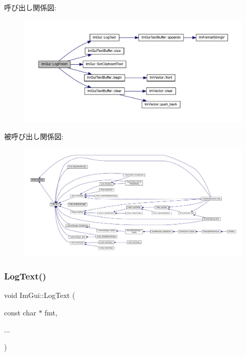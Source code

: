 呼び出し関係図\+:\nopagebreak
\begin{figure}[H]
\begin{center}
\leavevmode
\includegraphics[width=350pt]{namespace_im_gui_a2ebcd048d1ca025fb972e1c2e920e3f3_cgraph}
\end{center}
\end{figure}
被呼び出し関係図\+:
\nopagebreak
\begin{figure}[H]
\begin{center}
\leavevmode
\includegraphics[width=350pt]{namespace_im_gui_a2ebcd048d1ca025fb972e1c2e920e3f3_icgraph}
\end{center}
\end{figure}
\mbox{\label{namespace_im_gui_aa548475d8f771ab6524d73d900a41198}} 
\subsubsection{\texorpdfstring{Log\+Text()}{LogText()}}
{\footnotesize\ttfamily void Im\+Gui\+::\+Log\+Text (\begin{DoxyParamCaption}\item[{const char $\ast$}]{fmt,  }\item[{}]{... }\end{DoxyParamCaption})}



